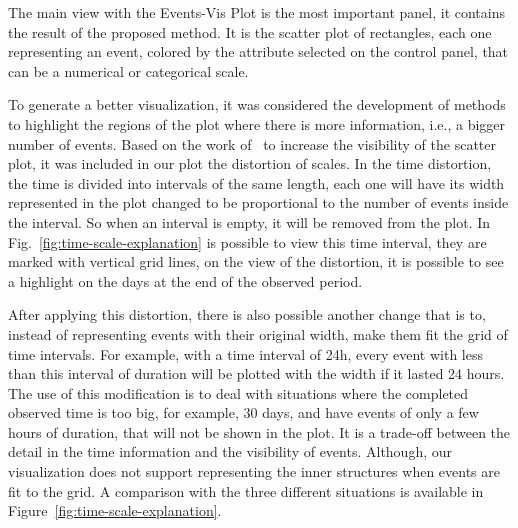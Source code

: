 The main view with the Events-Vis Plot is the most important panel, it contains the result of the proposed method. 
%
It is the scatter plot of rectangles, each one representing an event, colored by the attribute selected on the control panel, that can be a numerical or categorical scale.
%

To generate a better visualization, it was considered the development of methods to highlight the regions of the plot where there is more information, i.e., a bigger number of events.
%
Based on the work of~\cite{Janetzko2013} to increase the visibility of the scatter plot, it was included in our plot the distortion of scales.
%
In the time distortion, the time is divided into intervals of the same length, each one will have its width represented in the plot changed to be proportional to the number of events inside the interval.
%
So when an interval is empty, it will be removed from the plot.
%
In Fig.~\ref{fig:time-scale-explanation} is possible to view this time interval, they are marked with vertical grid lines, on the view of the distortion, it is possible to see a highlight on the days at the end of the observed period.
%

After applying this distortion, there is also possible another change that is to, instead of representing events with their original width, make them fit the grid of time intervals.
%
For example, with a time interval of 24h, every event with less than this interval of duration will be plotted with the width if it lasted 24 hours.
%
The use of this modification is to deal with situations where the completed observed time is too big, for example, 30 days, and have events of only a few hours of duration, that will not be shown in the plot.
%
It is a trade-off between the detail in the time information and the visibility of events.
%
Although, our visualization does not support representing the inner structures when events are fit to the grid.
%
A comparison with the three different situations is available in Figure~\ref{fig:time-scale-explanation}.


